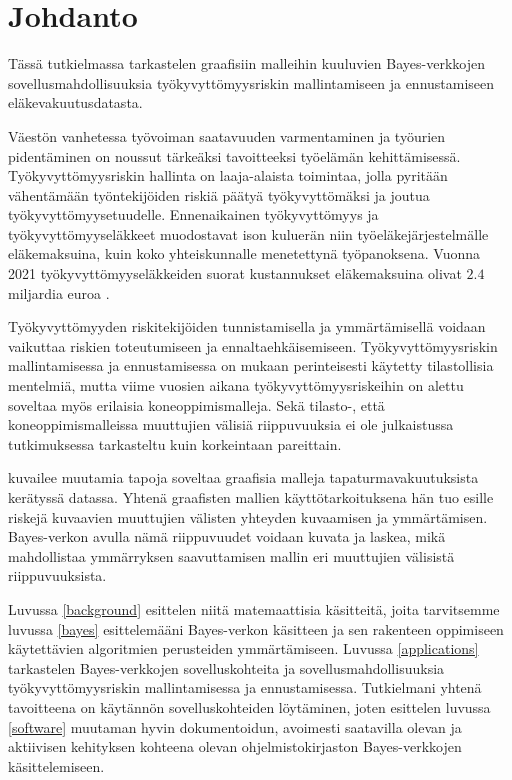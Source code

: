 \chapter{Johdanto\label{intro}}

Tässä tutkielmassa tarkastelen graafisiin malleihin kuuluvien Bayes-verkkojen sovellusmahdollisuuksia työkyvyttömyysriskin mallintamiseen ja ennustamiseen eläkevakuutusdatasta. 

Väestön vanhetessa työvoiman saatavuuden varmentaminen ja työurien pidentäminen on noussut tärkeäksi tavoitteeksi työelämän kehittämisessä. Työkyvyttömyysriskin hallinta on laaja-alaista toimintaa, jolla pyritään vähentämään työntekijöiden riskiä päätyä työkyvyttömäksi ja joutua työkyvyttömyysetuudelle.
Ennenaikainen työkyvyttömyys ja työkyvyttömyyseläkkeet muodostavat ison kuluerän niin työeläkejärjestelmälle eläkemaksuina, kuin koko yhteiskunnalle menetettynä työpanoksena. Vuonna 2021 työkyvyttömyyseläkkeiden suorat kustannukset eläkemaksuina olivat $2.4$ miljardia euroa \citep{etk_show_me_the_money}. 

Työkyvyttömyyden riskitekijöiden tunnistamisella ja ymmärtämisellä voidaan vaikuttaa riskien toteutumiseen ja ennaltaehkäisemiseen. Työkyvyttömyysriskin mallintamisessa ja ennustamisessa on \citet{gross_machine_2020} mukaan perinteisesti käytetty tilastollisia mentelmiä, mutta viime vuosien aikana työkyvyttömyysriskeihin on alettu soveltaa myös erilaisia koneoppimismalleja. Sekä tilasto-, että koneoppimismalleissa muuttujien välisiä riippuvuuksia ei ole julkaistussa tutkimuksessa tarkasteltu kuin korkeintaan pareittain.

 \citet{ramsahai_connecting_2020} kuvailee muutamia tapoja soveltaa graafisia malleja tapaturmavakuutuksista kerätyssä datassa. Yhtenä graafisten mallien käyttötarkoituksena hän tuo esille riskejä kuvaavien muuttujien välisten yhteyden kuvaamisen ja ymmärtämisen. Bayes-verkon avulla nämä riippuvuudet voidaan kuvata ja laskea, mikä mahdollistaa ymmärryksen saavuttamisen mallin eri muuttujien välisistä riippuvuuksista.

Luvussa \ref{background} esittelen niitä matemaattisia käsitteitä, joita tarvitsemme luvussa \ref{bayes} esittelemääni Bayes-verkon käsitteen ja sen rakenteen oppimiseen käytettävien algoritmien perusteiden ymmärtämiseen. Luvussa \ref{applications} tarkastelen Bayes-verkkojen sovelluskohteita ja sovellusmahdollisuuksia työkyvyttömyysriskin mallintamisessa ja ennustamisessa. Tutkielmani yhtenä tavoitteena on käytännön sovelluskohteiden löytäminen, joten esittelen luvussa \ref{software} muutaman hyvin dokumentoidun, avoimesti saatavilla olevan ja aktiivisen kehityksen kohteena olevan ohjelmistokirjaston Bayes-verkkojen käsittelemiseen. 



 

